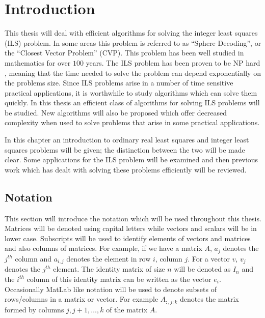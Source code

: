 \documentclass[12pt,Bold,letterpaper]{mcgilletdclass}
\begin{document}
\begin{romanPagenumber}{2}
%
%
\AbstractFr%

%
%
%
\tableofcontents %
\listoftables %
\listoffigures %

\end{romanPagenumber}

 
\chapter{Introduction}

This thesis will deal with efficient algorithms for solving the integer least squares (ILS) problem. In some areas this problem is referred to as ``Sphere Decoding'', or the ``Closest Vector Problem'' (CVP). This problem has been well studied in mathematics for over $100$ years. The ILS problem has been proven to be NP hard \cite{Mic01}, meaning that the time needed to solve the problem can depend exponentially on the problems size. Since ILS problems arise in a number of time sensitive practical applications, it is worthwhile to study algorithms which can solve them quickly. In this thesis an efficient class of algorithms for solving ILS problems will be studied. New algorithms will also be proposed which offer decreased complexity when used to solve problems that arise in some practical applications.

In this chapter an introduction to ordinary real least squares and integer least squares problems will be given; the distinction between the two will be made clear. Some applications for the ILS problem will be examined and then previous work which has dealt with solving these problems efficiently will be reviewed. 

\section{Notation}

This section will introduce the notation which will be used throughout this thesis. Matrices will be denoted using capital letters while vectors and scalars will be in lower case. Subscripts will be used to identify elements of vectors and matrices and also columns of matrices. For example, if we have a matrix $A$, $a_j$ denotes the $j^{th}$ column and $a_{i,j}$ denotes the element in row $i$, column $j$. For a vector $v$, $v_j$ denotes the $j^{th}$ element. The identity matrix of size $n$ will be denoted as $I_n$ and the $i^{th}$ column of this identity matrix can be written as the vector $e_i$. Occasionally MatLab like notation will be used to denote subsets of rows/columns in a matrix or vector. For example $A_{:,j:k}$ denotes the matrix formed by columns $j, j+1, \dots, k$ of the matrix $A$.
\end{document}
